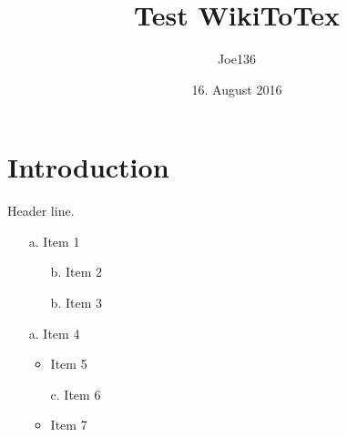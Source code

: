 \documentclass{article}
\title{Test WikiToTex}
\author{Joe136}
\date{16. August 2016}
\newcommand{\wikilist}[1]{\iffalse #1 \fi}
\begin{document}
\maketitle


\chapter{Introduction}

\wikilist{
Header line.
- Item 1
-- Item 2
-- Item 3
- Item 4
-- Item 5
-- Item 6
-- Item 7
}
Header line.
\begin{itemize}
   \item[a.] Item 1
   \begin{itemize}[itemindent=-0.4cm]
      \item[b.] Item 2
      \item[b.] Item 3
   \end{itemize}
   \item[a.] Item 4
   \begin{itemize}[itemindent=-0.4cm]
      \item Item 5
      \item[c.] Item 6
      \item Item 7
   \end{itemize}
\end{itemize}



\end{document}
